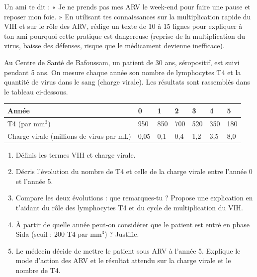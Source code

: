 \documentclass[11pt]{article}
\newcounter{popsec}
\newcounter{popsub}
\newcommand{\courssub}[1]{%
  \stepcounter{popsub}%
  \par\vspace{9pt}\noindent{\popxbold\fontsize{11.5}{13}\selectfont\color{popink}{\color{poporange}\thepopsec.\thepopsub}\hspace{6pt}#1}\par\nopagebreak\vspace{4pt}
}
\begin{document}
\begin{exercice}
Un ami te dit : « Je ne prends pas mes ARV le week-end pour faire une pause et reposer mon foie. »
En utilisant tes connaissances sur la multiplication rapide du VIH et sur le rôle des ARV, rédige un texte de 10 à 15 lignes pour expliquer à ton ami pourquoi cette pratique est dangereuse (reprise de la multiplication du virus, baisse des défenses, risque que le médicament devienne inefficace).
\end{exercice}

\courssub{Je me prépare au BEPC}

\begin{exercice}
Au Centre de Santé de Bafoussam, un patient de 30 ans, séropositif, est suivi pendant 5 ans. On mesure chaque année son nombre de lymphocytes T4 et la quantité de virus dans le sang (charge virale). Les résultats sont rassemblés dans le tableau ci-dessous.

\begin{center}
\begin{tabularx}{\linewidth}{|l|X|X|X|X|X|X|}
\hline
\rowcolor{popblueL} Année & 0 & 1 & 2 & 3 & 4 & 5 \\
\hline T4 (par mm$^3$) & 950 & 850 & 700 & 520 & 350 & 180 \\
\hline Charge virale (millions de virus par mL) & 0,05 & 0,1 & 0,4 & 1,2 & 3,5 & 8,0 \\
\hline
\end{tabularx}
\end{center}

\begin{enumerate}
\item Définis les termes VIH et charge virale.
\item Décris l'évolution du nombre de T4 et celle de la charge virale entre l'année 0 et l'année 5.
\item Compare les deux évolutions : que remarques-tu ? Propose une explication en t'aidant du rôle des lymphocytes T4 et du cycle de multiplication du VIH.
\item À partir de quelle année peut-on considérer que le patient est entré en phase Sida (seuil : 200 T4 par mm$^3$) ? Justifie.
\item Le médecin décide de mettre le patient sous ARV à l'année 5. Explique le mode d'action des ARV et le résultat attendu sur la charge virale et le nombre de T4.
\end{enumerate}
\end{exercice}
\end{document}

